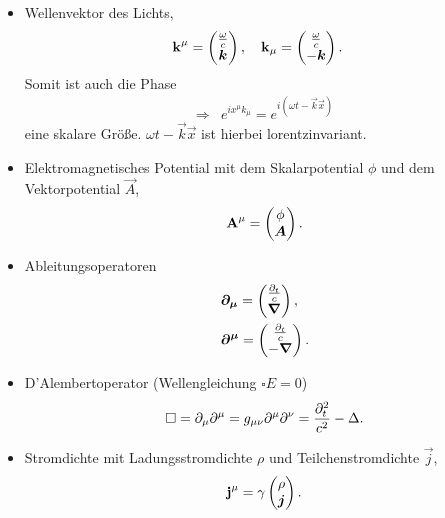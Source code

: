 \begin{itemize}[label=]
\item Wellenvektor des Lichts,
\begin{align*}
&\bm{\mathrm{k}}^\mu = 
\begin{pmatrix}\frac{\omega}{c}\\\bm{k}\end{pmatrix},\quad\bm{\mathrm{k}}_\mu = 
\begin{pmatrix}\frac{\omega}{c}\\-\bm{k}\end{pmatrix}.
\end{align*}
Somit ist auch die Phase
\begin{align*}
\Rightarrow & e^{ix^\mu k_\mu} = e^{i\left(\omega t -
\vec{k}\vec{x}\right)}
\end{align*}
eine skalare Größe. $\omega t - \vec{k}\vec{x}$ ist hierbei lorentzinvariant.
\item Elektromagnetisches Potential mit dem Skalarpotential $\phi$ und dem
Vektorpotential $\vec{A}$,
\begin{align*}
\bm{\mathrm{A}}^\mu = \begin{pmatrix}\phi\\\bm{A}\end{pmatrix}.
\end{align*}
\item Ableitungsoperatoren
\begin{align*}
&\rvec{\partial_\mu} = %
\begin{pmatrix}
\frac{\partial_t}{c}\\
\vec{\nabla}
\end{pmatrix},\\
&\rvec{\partial^\mu} = 
\begin{pmatrix}
\frac{\partial_t}{c}\\
-\vec{\nabla}
\end{pmatrix}.
\end{align*}
\item D'Alembertoperator (Wellengleichung $\square E = 0$)
\begin{align*}
\rvec{\square} = \partial_\mu\partial^\mu = g_{\mu\nu}\partial^\mu\partial^\nu
= \frac{\partial_t^2}{c^2}-\Delta. %
\end{align*}
\item Stromdichte mit Ladungsstromdichte $\rho$ und Teilchenstromdichte
$\vec{j}$,
\begin{align*}
\rvec{j}^\mu =
\gamma\begin{pmatrix} \rho\\ \vec{j}\end{pmatrix}.

\end{align*}
\end{itemize}

